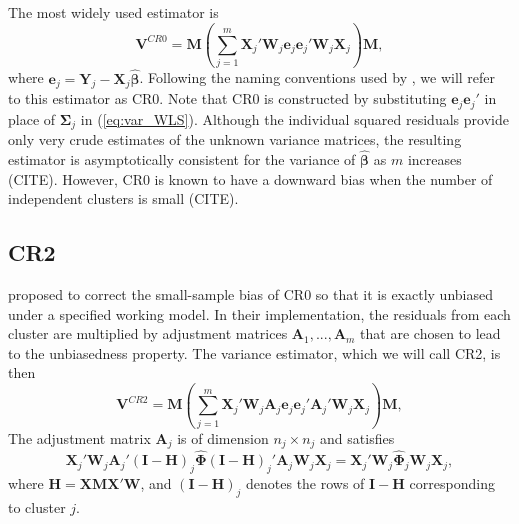 \documentclass[12pt]{article}\usepackage[]{graphicx}\usepackage[]{color}
\newcommand{\bm}{\mathbf}
\newcommand{\bs}{\boldsymbol}
\begin{document}
The most widely used estimator is 
\begin{equation}
\label{eq:V_CR0}
\bm{V}^{CR0} = \bm{M}\left(\sum_{j=1}^m \bm{X}_j'\bm{W}_j \bm{e}_j \bm{e}_j'\bm{W}_j \bm{X}_j\right) \bm{M},
\end{equation}
where $\bm{e}_j = \bm{Y}_j - \bm{X}_j \bs{\hat\beta}$. Following the naming conventions used by \citet{Cameron2015practitioners}, we will refer to this estimator as CR0. 
Note that CR0 is constructed by substituting $\bm{e}_j \bm{e}_j'$ in place of $\bs\Sigma_j$ in (\ref{eq:var_WLS}). 
Although the individual squared residuals provide only very crude estimates of the unknown variance matrices, the resulting estimator is asymptotically consistent for the variance of $\bs{\hat\beta}$ as $m$ increases (CITE). 
However, CR0 is known to have a downward bias when the number of independent clusters is small (CITE).

\subsection{CR2}

\citet[see also \citealp{Bell2002bias}]{McCaffrey2001generalizations} proposed to correct the small-sample bias of CR0 so that it is exactly unbiased under a specified working model. 
In their implementation, the residuals from each cluster are multiplied by adjustment matrices $\bm{A}_1,...,\bm{A}_m$ that are chosen to lead to the unbiasedness property. 
The variance estimator, which we will call CR2, is then 
\begin{equation}
\label{eq:V_CR2}
\bm{V}^{CR2} = \bm{M}\left(\sum_{j=1}^m \bm{X}_j'\bm{W}_j \bm{A}_j \bm{e}_j \bm{e}_j' \bm{A}_j' \bm{W}_j \bm{X}_j\right) \bm{M},
\end{equation}
The adjustment matrix $\bm{A}_j$ is of dimension $n_j \times n_j$ and satisfies
\begin{equation}
\label{eq:CR2_criterion}
\bm{X}_j' \bm{W}_j \bm{A}_j' \left(\bm{I} - \bm{H}\right)_j \hat{\bs\Phi} \left(\bm{I} - \bm{H}\right)_j' \bm{A}_j \bm{W}_j \bm{X}_j = \bm{X}_j' \bm{W}_j \hat{\bs\Phi}_j \bm{W}_j \bm{X}_j,
\end{equation}
where $\bm{H} = \bm{X}\bm{M}\bm{X}'\bm{W}$, and $\left(\bm{I} - \bm{H}\right)_j$ denotes the rows of $\bm{I} - \bm{H}$ corresponding to cluster $j$. 
\end{document}
